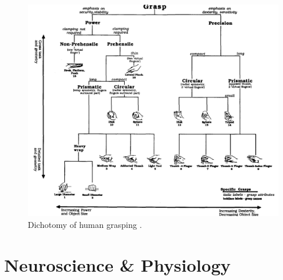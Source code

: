 \begin{landscape}
\begin{figure}
    \includegraphics[width=\linewidth]{images/grasp_dichotomy}
    \caption{Dichotomy of human grasping \cite{cutkosky1989grasp}.}
    \label{fig:grasp_dichotomy}
\end{figure}
\end{landscape}

\section{Neuroscience \& Physiology}

